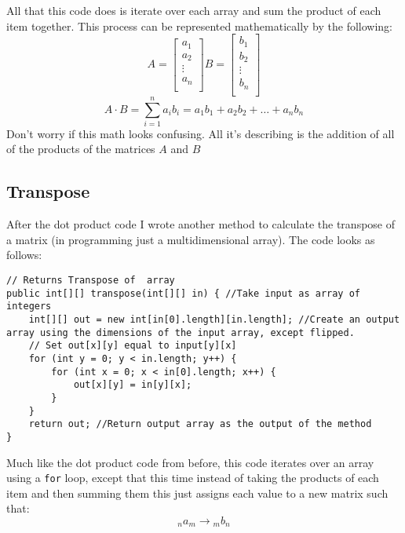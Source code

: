\documentclass{memoir}
\begin{document}
	All that this code does is iterate over each array and sum the product of each item together. This process can be represented mathematically by the following:
	\[
		A =
		\begin{bmatrix}
			a_1    \\
			a_2    \\
			\vdots \\
			a_n    \\
		\end{bmatrix}
		B =
		\begin{bmatrix}
			b_1    \\
			b_2    \\
			\vdots \\
			b_n    \\
		\end{bmatrix}
	\]
	\[
		A \cdot B = \sum^n_{i=1} a_ib_i = a_1b_1 + a_2b_2 + \dots + a_nb_n
	\]
	Don't worry if this math looks confusing. All it's describing is the addition of all of the products of the matrices $A$ and $B$
	\subsection{Transpose}

	After the dot product code I wrote another method to calculate the transpose of a matrix (in programming just a multidimensional array). The code looks as follows:
	\begin{lstlisting}[caption = {Method to Return Transpose of an Array in Java}]
// Returns Transpose of  array
public int[][] transpose(int[][] in) { //Take input as array of integers
	int[][] out = new int[in[0].length][in.length]; //Create an output array using the dimensions of the input array, except flipped.
	// Set out[x][y] equal to input[y][x]
	for (int y = 0; y < in.length; y++) {
		for (int x = 0; x < in[0].length; x++) {
			out[x][y] = in[y][x];
		}
	}
	return out; //Return output array as the output of the method
}
	\end{lstlisting}

	Much like the dot product code from before, this code iterates over an array using a \lstinline{for} loop, except that this time instead of taking the products of each item and then summing them this just assigns each value to a new matrix such that:
	\[
		_na_m \rightarrow {}_mb_n
	\]

	\printbibliography
\end{document}
